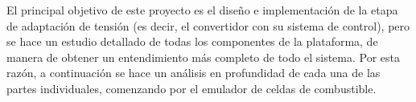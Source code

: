 El principal objetivo de este proyecto es el diseño e implementación de la etapa de adaptación de tensión (es decir, el convertidor con su sistema de control), pero se hace un estudio detallado de todas los componentes de la plataforma, de manera de obtener un entendimiento más completo de todo el sistema. Por esta razón, a continuación se hace un análisis en profundidad de cada una de las partes individuales, comenzando por el emulador de celdas de combustible.\\




